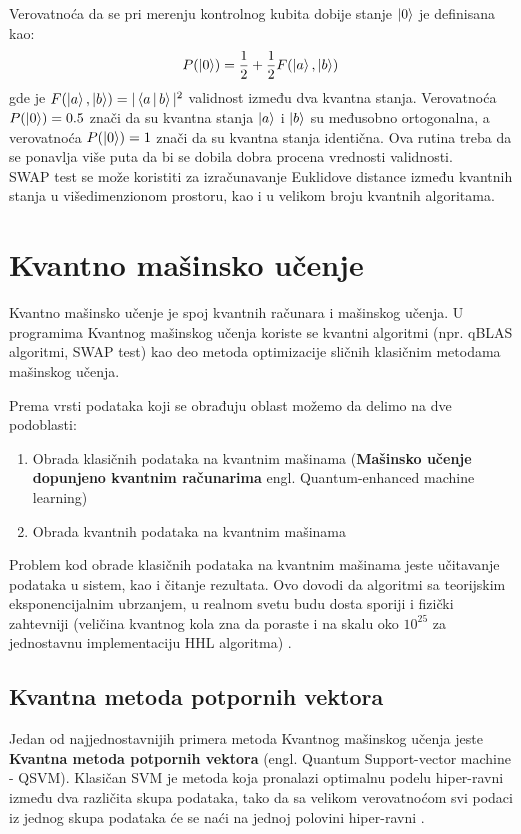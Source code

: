 \documentclass[12pt, letterpaper, oneside]{article}
\begin{document}
Verovatnoća da se pri merenju kontrolnog kubita dobije stanje $\Ket{0}$ je definisana kao:
\[
  P(\Ket{0}) = \frac{1}{2} + \frac{1}{2}F(\Ket{a},\Ket{b})  
\]
gde je $F(\Ket{a},\Ket{b}) = |\Braket{a|b}|^2$ validnost između dva kvantna stanja.
Verovatnoća $P(\Ket{0}) = 0.5$ znači da su kvantna stanja  $\Ket{a}$ i $\Ket{b}$ su međusobno ortogonalna, 
a verovatnoća $P(\Ket{0}) = 1$ znači da su kvantna stanja identična. Ova rutina treba da se ponavlja više puta da bi se dobila dobra procena vrednosti validnosti. \\
SWAP test se može koristiti za izračunavanje Euklidove distance između kvantnih stanja u višedimenzionom prostoru, kao i u velikom broju kvantnih algoritama.

\newpage
\section{Kvantno mašinsko učenje}
Kvantno mašinsko učenje je spoj kvantnih računara i mašinskog učenja. U programima Kvantnog mašinskog učenja koriste se kvantni algoritmi (npr. qBLAS algoritmi, SWAP test)
kao deo metoda optimizacije sličnih klasičnim metodama mašinskog učenja. 

Prema vrsti podataka koji se obrađuju oblast možemo da delimo na dve podoblasti:
\begin{enumerate}
    \item Obrada klasičnih podataka na kvantnim mašinama (\textbf{Mašinsko učenje dopunjeno kvantnim računarima} engl. Quantum-enhanced machine learning)
    \item Obrada kvantnih podataka na kvantnim mašinama
\end{enumerate}
Problem kod obrade klasičnih podataka na kvantnim mašinama jeste učitavanje podataka u sistem, kao i čitanje rezultata. Ovo dovodi da algoritmi sa teorijskim eksponencijalnim
ubrzanjem, u realnom svetu budu dosta sporiji i fizički zahtevniji (veličina kvantnog kola zna da poraste i na skalu oko $10^{25}$ za jednostavnu implementaciju HHL algoritma) \cite{Quantum_machine_learning}.

\subsection{Kvantna metoda potpornih vektora}
Jedan od najjednostavnijih primera metoda Kvantnog mašinskog učenja jeste \textbf{Kvantna metoda potpornih vektora} (engl. Quantum Support-vector machine - QSVM). Klasičan SVM je metoda koja pronalazi optimalnu podelu hiper-ravni
između dva različita skupa podataka, tako da sa velikom verovatnoćom svi podaci iz jednog skupa podataka će se naći na jednoj polovini hiper-ravni \cite{Quantum_machine_learning}.
\end{document}
